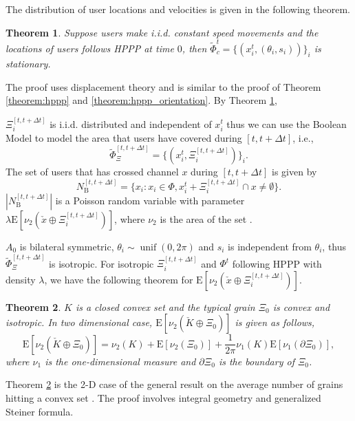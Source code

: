 \documentclass[10pt, conference, letterpaper]{IEEEtran}
\newtheorem{theorem}{Theorem}
\DeclareMathOperator*{\unif}{unif}
\begin{document}
The distribution of user locations and velocities is given in the following theorem.
\begin{theorem}\label{theorem:boolean_stationary}
Suppose users make i.i.d. constant speed movements and the locations of users follows HPPP at time $0$, then $\tilde{\Phi}_c^t = \{(x_i^t, (\theta_i, s_i))\}_i$ is stationary.
\end{theorem}
The proof uses displacement theory and is similar to the proof of Theorem \ref{theorem:hppp} and \ref{theorem:hppp_orientation}.
By Theorem \ref{theorem:boolean_stationary}, 

$\Xi_i^{[t, t+\Delta t]}$ is i.i.d. distributed and independent of $x_i^t$ thus we can use the Boolean Model \cite{stochasticgeometry} to model the area that users have covered during $[t, t+\Delta t]$, i.e., 
\begin{equation*}
\tilde{\Phi}_{\Xi}^{[t, t+\Delta t]} = \{(x_i^t, \Xi_i^{[t, t+\Delta t]})\}_i.
\end{equation*}
The set of users that has crossed channel $x$ during $[t, t+\Delta t]$ is given by
\begin{equation*}
N_{\mathrm{B}}^{[t, t + \Delta t]} = \{x_i:x_i \in \Phi, x_i^t+\Xi_i^{[t, t+\Delta t]}\cap x \neq \emptyset \}.
\end{equation*}
$|N_{\mathrm{B}}^{[t, t + \Delta t]}|$ is a Poisson random variable with parameter $\lambda\mathrm{E}[\nu_2(\check{x}\oplus \Xi_i^{[t, t+\Delta t]})]$, where $\nu_2$ is the area of the set \cite{stochasticgeometry}.

$A_0$ is bilateral symmetric, $\theta_i\sim\unif(0, 2\pi)$ and $s_i$ is independent from $\theta_i$, thus $\tilde{\Phi}_{\Xi}^{[t, t+\Delta t]}$ is isotropic. For isotropic $\Xi_i^{[t, t+\Delta t]}$ and $\Phi^t$ following HPPP with density $\lambda$, we have the following theorem for $\mathrm{E}[\nu_2(\check{x}\oplus\Xi_i^{[t, t+\Delta t]})]$.

\begin{theorem}\label{theorem:boolean_mean}
$K$ is a closed convex set and the typical grain $\Xi_0$ is convex and isotropic. In two dimensional case, $\mathrm{E}[\nu_2(\check{K}\oplus \Xi_0)]$ is given as follows,
\begin{equation}
\mathrm{E}[\nu_2(\check{K}\oplus \Xi_0)] = \nu_2(K) + \mathrm{E}[\nu_2(\Xi_0)] + \frac{1}{2\pi}\nu_1(K)\mathrm{E}[\nu_1(\partial \Xi_0)],
\end{equation}
where $\nu_1$ is the one-dimensional measure and $\partial \Xi_0$ is the boundary of $\Xi_0$.
\end{theorem}
Theorem \ref{theorem:boolean_mean} is the 2-D case of the general result on the average number of grains hitting a convex set \cite{}. The proof involves integral geometry and generalized Steiner formula.
\end{document}
